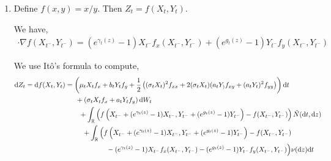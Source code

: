 \begin{solution}[Solution]
\begin{enumerate}[label=(\alph*)]
    \item Define \( f(x,y) = x/y \). Then \( Z_t = f(X_t,Y_t) \).

        We have,
        \begin{align*}
            [(e^{\gamma_t(z)}-1)X_t; (e^{g_t(z)}-1)Y_t] \cdot \nabla f(X_{t^-},Y_{t^-}) 
            = (e^{\gamma_t(z)}-1) X_{t^-} f_x(X_{t^-},Y_{t^-}) + (e^{g_t(z)}-1)Y_{t^-} f_y(X_{t^-},Y_{t^-})
        \end{align*}

        We use It\^o's formula to compute,
        \begin{align*}
            \mathrm{d} Z_t = \mathrm{d} f(X_t,Y_t)
            &= \left( \mu_t X_t f_x + b_tY_t f_y
            + \frac{1}{2} \left( (\sigma_t X_t)^2 f_{xx} + 2(\sigma_t X_t)(a_tY_) f_{xy} + (a_tY_t)^2f_{yy} \right) \right) \mathrm{d} t
            \\& \hspace{1.5em}+ \left( \sigma_t X_t f_x + a_t Y_t f_y \right) \mathrm{d} W_t
            \\& \hspace{2em}+ \int_{\mathbb{R}} \left( f \left(X_{t^-}+(e^{\gamma_t(z)}-1)X_{t^-},Y_{t^-} + (e^{g_t(z)}-1)Y_{t^-} \right)  - f(X_{t^-},Y_{t^-}) \right) \tilde{N}(\mathrm{d} t,\mathrm{d} z)
            \\& \hspace{2.5em}+ \int_{\mathbb{R}} \Big( f \left(X_{t^-}+(e^{\gamma_t(z)}-1)X_{t^-},Y_{t^-} + (e^{g_t(z)}-1)Y_{t^-} \right)  - f(X_{t^-},Y_{t^-}) 
            \\&  \hspace{6em} - (e^{\gamma_t(z)}-1) X_{t^-} f_x(X_{t^-},Y_{t^-}) - (e^{g_t(z)}-1)Y_{t^-} f_y(X_{t^-},Y_{t^-}) \Big) \nu(\mathrm{d} z) \mathrm{d} t
        \end{align*}
       


\end{enumerate}
\end{solution}
